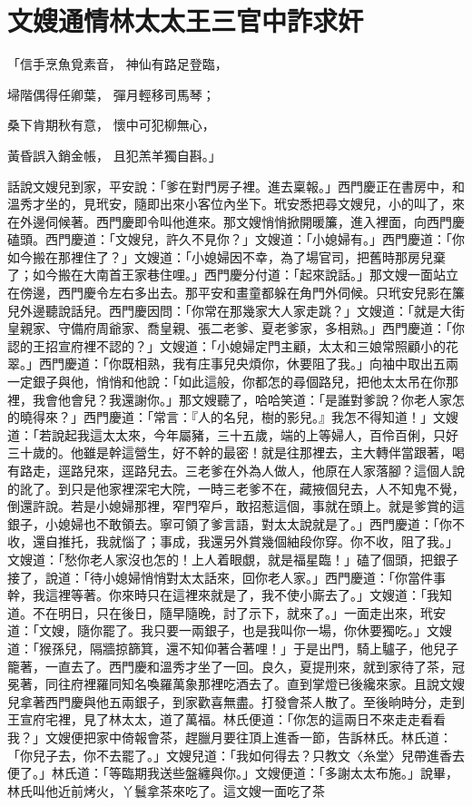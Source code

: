 %

\chapter{文嫂通情林太太\KG 王三官中詐求奸}


「信手烹魚覓素音，  神仙有路足登臨，

埽階偶得任卿葉，  彈月輕移司馬琴；

桑下肯期秋有意，  懷中可犯柳無心，

黃昏誤入銷金帳，  且犯羔羊獨自斟。」

話說文嫂兒到家，平安說：「爹在對門房子裡。進去稟報。」西門慶正在書房中，和溫秀才坐的，見玳安，隨即出來小客位內坐下。玳安悉把尋文嫂兒，小的叫了，來在外邊伺候著。西門慶即令叫他進來。那文嫂悄悄掀開暖簾，進入裡面，向西門慶磕頭。西門慶道：「文嫂兒，許久不見你？」文嫂道：「小媳婦有。」西門慶道：「你如今搬在那裡住了？」文嫂道：「小媳婦因不幸，為了場官司，把舊時那房兒棄了；如今搬在大南首王家巷住哩。」西門慶分付道：「起來說話。」那文嫂一面站立在傍邊，西門慶令左右多出去。那平安和畫童都躲在角門外伺候。只玳安兒影在簾兒外邊聽說話兒。西門慶因問：「你常在那幾家大人家走跳？」文嫂道：「就是大街皇親家、守備府周爺家、喬皇親、張二老爹、夏老爹家，多相熟。」西門慶道：「你認的王招宣府裡不認的？」文嫂道：「小媳婦定門主顧，太太和三娘常照顧小的花翠。」西門慶道：「你既相熟，我有庄事兒央煩你，休要阻了我。」向袖中取出五兩一定銀子與他，悄悄和他說：「如此這般，你都怎的尋個路兒，把他太太吊在你那裡，我會他會兒？我還謝你。」那文嫂聽了，哈哈笑道：「是誰對爹說？你老人家怎的曉得來？」西門慶道：「常言：『人的名兒，樹的影兒。』我怎不得知道！」文嫂道：「若說起我這太太來，今年屬豬，三十五歲，端的上等婦人，百伶百俐，只好三十歲的。他雖是幹這營生，好不幹的最密！就是往那裡去，主大轉伴當跟著，喝有路走，逕路兒來，逕路兒去。三老爹在外為人做人，他原在人家落腳？這個人說的訛了。到只是他家裡深宅大院，一時三老爹不在，藏掖個兒去，人不知鬼不覺，倒還許說。若是小媳婦那裡，窄門窄戶，敢招惹這個，事就在頭上。就是爹賞的這銀子，小媳婦也不敢領去。寧可領了爹言語，對太太說就是了。」西門慶道：「你不收，還自推托，我就惱了；事成，我還另外賞幾個紬段你穿。你不收，阻了我。」文嫂道：「愁你老人家沒也怎的！上人着眼覷，就是福星臨！」磕了個頭，把銀子接了，說道：「待小媳婦悄悄對太太話來，回你老人家。」西門慶道：「你當件事幹，我這裡等著。你來時只在這裡來就是了，我不使小廝去了。」文嫂道：「我知道。不在明日，只在後日，隨早隨晚，討了示下，就來了。」一面走出來，玳安道：「文嫂，隨你罷了。我只要一兩銀子，也是我叫你一場，你休要獨吃。」文嫂道：「猴孫兒，隔牆掠篩箕，還不知仰著合著哩！」于是出門，騎上驢子，他兒子籠著，一直去了。西門慶和溫秀才坐了一回。良久，夏提刑來，就到家待了茶，冠冕著，同往府裡羅同知名喚羅萬象那裡吃酒去了。直到掌燈已後纔來家。且說文嫂兒拿著西門慶與他五兩銀子，到家歡喜無盡。打發會茶人散了。至後晌時分，走到王宣府宅裡，見了林太太，道了萬福。林氏便道：「你怎的這兩日不來走走看看我？」文嫂便把家中倚報會茶，趕臘月要往頂上進香一節，告訴林氏。林氏道：「你兒子去，你不去罷了。」文嫂兒道：「我如何得去？只教文〈糸堂〉兒帶進香去便了。」林氏道：「等臨期我送些盤纏與你。」文嫂便道：「多謝太太布施。」說畢，林氏叫他近前烤火，丫鬟拿茶來吃了。這文嫂一面吃了茶